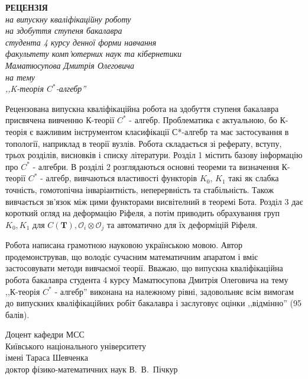 \documentclass[a4paper,12pt]{report}
\begin{document}

    \begin{center}
        \textbf{РЕЦЕНЗІЯ \\}
        \textit{на випускну кваліфікаційну роботу \\
            на здобуття ступеня бакалавра \\
            студента 4 курсу денної форми навчання \\
            факультету комп'ютерних наук та кібернетики \\
            Маматюсупова Дмитрія Олеговича \\
            на тему \\ ,,K-теорія $C^*$-алгебр''}

    \end{center}

    \vspace{3mm}

    Рецензована випускна кваліфікаційна робота на здобуття ступеня бакалавра присвячена вивченню К-теорії $C^*$ - алгебр.
    Проблематика є актуальною, бо К-теорія є важливим інструментом класифікації С*-алгебр та має застосування
    в топології, наприклад в теорії вузлів.
    Робота складається зі реферату, вступу, трьох розділів, висновків і списку літератури.
    Розділ 1 містить базову інформацію про $C^*$ - алгебри.
    В розділі 2 розглядаються основні теореми та визначення К-теорії $C^*$ - алгебр, вивчаються властивості функторів
    $K_0$, $K_1$ такі як слабка точність, гомотопічна інваріантність, неперервність та стабільність. Також
    вивчається зв'язок між цими функторами висвітелний в теоремі Бота.
    Розділ 3 дає короткий огляд на деформацію Ріфеля, а потім приводить обрахування груп $K_0, K_1$ для
    $C(\mathbf{T}), \mathcal{O}_i \otimes \mathcal{O}_j$ та автоматично для їх деформіцій Ріфеля.

    Робота написана грамотною науковою українською мовою.
    Автор продемонстрував, що володіє сучасним математичним апаратом і вміє застосовувати методи вивчаємої теорії.
    Вважаю, що випускна кваліфікаційна робота бакалавра студента 4 курсу Маматюсупова Дмитрія Олеговича на
    тему ,,К-теорія $C^*$ - алгебр'' виконана на належному рівні,
    задовольняє всім вимогам до випускних кваліфікаційних робіт бакалавра і заслуговує оцінки ,,відмінно'' (95 балів).

    \vspace{3mm}


    \noindent
    Доцент кафедри МСС\\
    Київського національного університету\\
    імені Тараса Шевченка \\
    доктор фізико-математичних наук \hspace{4cm} В.~В.~Пічкур




    \pagestyle{empty}
\end{document}
